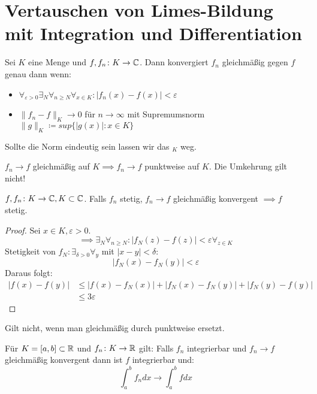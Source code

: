 \section{Vertauschen von Limes-Bildung mit Integration und Differentiation}
\begin{definition}
Sei $K$ eine Menge und $f,f_n \colon K \to \mathbb{C}$. Dann konvergiert $f_n$ gleichmäßig gegen $f$ genau dann wenn:
\begin{itemize}
\item $\forall_{\varepsilon>0}\exists_{N}\forall_{n\ge N}\forall_{x \in K}: |f_n(x)-f(x)| < \varepsilon    $ 
\item $\|f_n -f\|_K \to 0$ für $n \to \infty$  mit Supremumsnorm $\|g\|_K \coloneqq sup \{|g(x)| : x \in K\} $ 
\end{itemize}
\end{definition}
\begin{remark}
Sollte die Norm eindeutig sein lassen wir das $_K$ weg. 
\end{remark}
\begin{corollary}
$f_n \to f$ gleichmäßig auf $K \implies f_n \to f$ punktweise auf $K$. Die Umkehrung gilt nicht!  
\end{corollary}
\begin{theorem}
	\label{thm:satz1}
	$f,f_n \colon K \to \mathbb{C} , K \subset \mathbb{C}$. Falls $f_n$ stetig, $f_n \to f$ gleichmäßig konvergent $\implies f$  stetig.
\end{theorem}
\begin{proof}
Sei $x \in K, \varepsilon>0$.
\[
\implies \exists_{N}\forall_{n \ge N}: |f_N(z)- f(z)| < \varepsilon \forall_{z \in K}   
\]
Stetigkeit von $f_N: \exists_{\delta >0}\forall_{y} $ mit $|x-y| < \delta$:
\[
	|f_N(x) -f_N(y)| < \varepsilon
\]
Daraus folgt:
\begin{align*}
	|f(x)-f(y)| &\le  | f(x)-f_N(x)| + |f_N(x)-f_N(y)| + | f_N(y)-f(y)| \\
	&\le 3 \varepsilon
\end{align*}
\end{proof}
\begin{remark}
Gilt nicht, wenn man gleichmäßig durch punktweise ersetzt.
\end{remark}
\begin{theorem}
	\label{thm:satz2}
	Für $K=[a,b] \subset \mathbb{R}$ und $f_n \colon K \to \mathbb{R} $ gilt: Falls $f_n$ integrierbar und $f_n \to f$ gleichmäßig konvergent dann ist $f$ integrierbar und:
	\[
	\int_a^b f_n dx \to \int_a^b f dx
	\]
\end{theorem}
